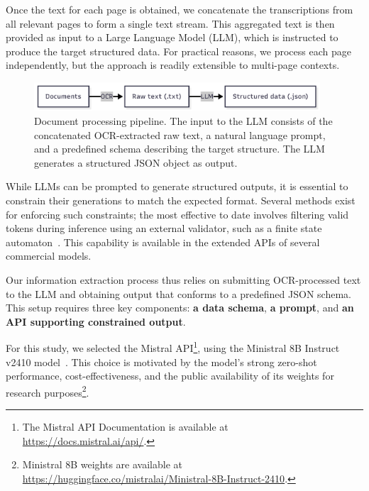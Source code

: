 Once the text for each page is obtained, we concatenate the transcriptions from all relevant pages to form a single text stream. This aggregated text is then provided as input to a Large Language Model (LLM), which is instructed to produce the target structured data. For practical reasons, we process each page independently, but the approach is readily extensible to multi-page contexts.

\begin{figure}[tb!]
  \centering
   \includegraphics[width=0.95\textwidth]{img/pipeline.pdf}
  \caption{Document processing pipeline. The input to the LLM consists of the concatenated OCR-extracted raw text, a natural language prompt, and a predefined schema describing the target structure. The LLM generates a structured JSON object as output.
  }
  \label{fig:schema_pipeline}
\end{figure}

While LLMs can be prompted to generate structured outputs, it is essential to constrain their generations to match the expected format. Several methods exist for enforcing such constraints; the most effective to date involves filtering valid tokens during inference using an external validator, such as a finite state automaton~\cite{willard2023efficient}. This capability is available in the extended APIs of several commercial models.

Our information extraction process thus relies on submitting OCR-processed text to the LLM and obtaining output that conforms to a predefined JSON schema. This setup requires three key components: \textbf{a data schema}, \textbf{a prompt}, and \textbf{an API supporting constrained output}.

For this study, we selected the Mistral API\footnote{The Mistral API Documentation is available at \url{https://docs.mistral.ai/api/}.}, using the Ministral 8B Instruct v2410 model~\cite{MistralAI2024Ministral8B}. This choice is motivated by the model's strong zero-shot performance, cost-effectiveness, and the public availability of its weights for research purposes\footnote{Ministral 8B weights are available at \url{https://huggingface.co/mistralai/Ministral-8B-Instruct-2410}.}.


